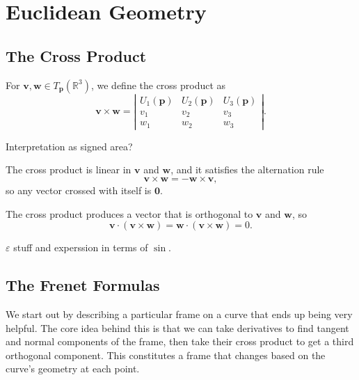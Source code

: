 \documentclass[twoside,10pt]{report}
\begin{document}

\chapter{Euclidean Geometry}


\section{The Cross Product}

For $\mathbf{v}, \mathbf{w} \in T_{\mathbf{p}}(\mathbb{R}^3)$, we define the cross product as
\[
\mathbf{v} \times \mathbf{w} = \left| 
\begin{matrix}
	U_1(\mathbf{p}) & U_2(\mathbf{p}) & U_3(\mathbf{p}) \\
	v_1 & v_2 & v_3 \\
	w_1 & w_2 & w_3
\end{matrix}\right|.
\] 

{\color{red}Interpretation as signed area?}

The cross product is linear in $\mathbf{v}$ and $\mathbf{w}$, and it satisfies the alternation rule
\[
\mathbf{v} \times \mathbf{w} = -\mathbf{w}\times \mathbf{v},
\] so any vector crossed with itself is $\mathbf{0}$.

The cross product produces a vector that is orthogonal to $\mathbf{v}$ and $\mathbf{w}$, so
\[
	\mathbf{v} \cdot (\mathbf{v}\times \mathbf{w}) = \mathbf{w}\cdot (\mathbf{v}\times \mathbf{w}) = 0.
\] 

{\color{red}$\varepsilon$ stuff and experssion in terms of $\sin$.}


\section{The Frenet Formulas}

We start out by describing a particular frame on a curve that ends up being very helpful. The core idea behind this is that we can take derivatives to find tangent and normal components of the frame, then take their cross product to get a third orthogonal component. This constitutes a frame that changes based on the curve's geometry at each point.
\end{document}
